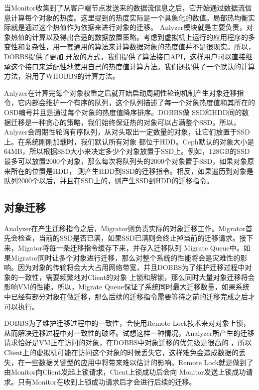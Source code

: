 当Monitor收集到了从客户端节点发送来的数据流信息之后，它开始通过数据流信息计算每个对象的热度。这里提到的热度实际是一个具象化的数值。局部热均衡实际就是通过这个热值作为依据来进行对象的迁移。
Anlyzer模块就是主要负责，对象热值的计算以及得出合适的数据放置策略。考虑到虚拟机上运行的应用程序的多变性和复杂性，用一套通用的算法来计算数据对象的热度值并不是很现实。所以，DOBBS提供了更加
开放的方式，我们提供了算法接口API，这样用户可以直接继承这个接口来适配性地使用自己的热度值计算方法。我们还提供了一个默认的计算方法，沿用了WHOBBS\cite{lingxuan2015whobbs}的计算方法。

Anlyzer在计算完每个对象权重之后就开始启动周期性轮询机制产生对象迁移指令，它内部会维护一个有序的队列，这个队列描述了每一个对象热度值和其所在的OSD编号并且是通过每个对象的热度值降序排序。DOBBS做
SSD和HDD间的数据迁移是一种贪心的策略，我们始终保证热的对象可以占满整个SSD。所以，Anlyzer会周期性轮询有序队列，从对头取出一定数量的对象，让它们放置于SSD上。在系统刚刚加载时，我们默认所有对象
都位于HDD。Ceph默认的对象大小是64MB，所以根据SSD大小来决定多少个对象放置于SSD上。例如，128GB的SSD最多可以放置2000个对象，那么每次将队列头的2000个对象置于SSD，如果对象原来所在的位置是HDD，
则产生HDD到SSD的迁移指令。相反，如果遍历到对象是队列2000个以后，并且在SSD上的，则产生SSD到HDD的迁移指令。

\subsection{对象迁移}
Analyzer在产生迁移指令之后，Migrator则负责实际的对象迁移工作。Migrator首先会检查，当前的SSD是否已满，如果SSD已满则会终止掉当前的迁移请求。接下来，Migator将每一条迁移指令缓存下来，并存入迁移队列
Migrate Queue中。如果Migrator同时让多个对象进行迁移，那么对整个系统的性能将会是灾难性的影响。因为对象的传输将会大大占用网络带宽，并且DOBBS为了维护迁移过程中对象的一致性，需要频繁地对Client的对象
上锁和解锁，那么同时大量对象迁移将会影响VM的性能。所以，Migrate Queue保证了系统同时最大迁移数量，如果系统中已经有部分对象在做迁移，那么后续的迁移指令需要等待之前的迁移完成之后才可以执行。

DOBBS为了维护迁移过程中的一致性，会使用Remote Lock\cite{lingxuan2015whobbs}技术来对对象上锁，从而解决迁移过程中对一致性的破坏。试想这样一种情况，Analyzer所产生的迁移请求恰好是VM正在访问的对象，在DOBBS中对象迁移的优先级是很高的
，所以Client上的虚拟机可能在访问这个对象的时候丢失它，这样难免会造成数据的丢失，在一些数据关键型的应用中将带来难以估计的影响。Remote Lock就是做到了由Monitor向Client发起上锁请求，Client上锁成功后会向
Monitor发送上锁成功请求。只有Monitor在收到上锁成功请求后才会进行后续的迁移。

